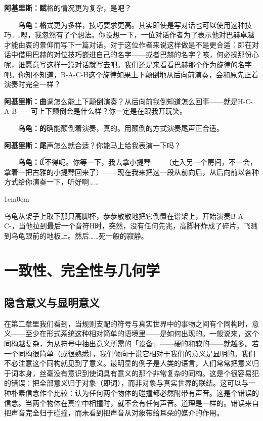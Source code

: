 \documentclass[
  12pt,
  twoside,
  openright,
  oldfontcommands,
]{memoir}
\newcommand{\kaitismall}[1]{{\kaitifamily\small #1}}
\newcommand{\heititext}[1]{{\heifamily\bfseries #1}}
\newcommand{\dialogname}[1]{{\heifamily\bfseries #1}}
\newenvironment{dialogguide}{%
  \begin{adjustwidth}{1em}{0em}\kaitifamily\itshape\small%
}{%
  \end{adjustwidth}%
}
\begin{document}
\dialogname{阿基里斯：}\heititext{赋}格的情况更为复杂，是吧？

\dialogname{　　乌龟：}\heititext{格}式更为多样，技巧要求更高。其实即使是写对话也可以使用这种技巧\ldots\ldots 嗯，我忽然有了个想法。你设想一下，一位对话作者为了表示他对巴赫卓越才能由衷的景仰而写下一篇对话，对于这位作者来说这样做是不是更合适：即在对话中借用巴赫的对位技巧嵌进自己的名字------或者巴赫的名字？咳，何必操那份心呢，谁愿意写这样一篇对话就写去吧。我们还是来看看巴赫那个作为旋律的名字吧。你知不知道，B-A-C-H这个旋律如果上下颠倒地从后向前演奏，会和原先正着演奏时完全一样？

\dialogname{阿基里斯：}\heititext{曲}调怎么能上下颠倒演奏？从后向前我倒知道怎么回事------就是H-C-A-B------可上下颠倒会是什么样？你一定是在跟我开玩笑。

\dialogname{　　乌龟：}\heititext{的}确能颠倒着演奏，真的。用颠倒的方式演奏尾声正合适。

\dialogname{阿基里斯：}\heititext{尾}声怎么就合适？你能马上给我表演一下吗？

\dialogname{　　乌龟：}{\gebfont ꪞ}不得呢。你等一下，我去拿小提琴------\kaitismall{（走入另一个房间，不一会，拿着一把古雅的小提琴回来了）}------现在我来把这一段从前向后，从后向前以各种方式给你演奏一下，听好啊\ldots\ldots{}

\hfill\break

\begin{dialogguide}
乌龟从架子上取下那只高脚杯，恭恭敬敬地把它倒置在谱架上，开始演奏B-A-C-，当他拉到最后一个音符H时，突然，没有任何先兆，高脚杯炸成了碎片，飞溅到乌龟跟前的地板上。然后\ldots\ldots 死一般的寂静。
\end{dialogguide}

\label{Chapter04.xhtml}{}

\chapter{一致性、完全性与几何学}

\section{隐含意义与显明意义}

在第二章里我们看到，当规则支配的符号与真实世界中的事物之间有个同构时，意义------至少在形式系统这种相对简单的语境里------是如何出现的。一般说来，这个同构越复杂，为从符号中抽出意义所需的「设备」------硬的和软的------就越多。若一个同构很简单（或很熟悉），我们倾向于说它相对于我们的意义是显明的。我们不必注意这个同构就见到了意义。最明显的例子是人类的语言，人们常常把意义归于词本身，丝毫没有意识到使词具有意义的那个非常复杂的同构。这是个很容易犯的错误：把全部意义归于对象（即词），而非对象与真实世界的联结。这可以与一种朴素信念作个比较：认为任何两个物体的碰撞都必然附带有声音。这是个错误的信念。当两个物体在真空中相撞时，就不会有任何声音。道理是一样的。错误来自把声音完全归于碰撞，而未看到把声音从对象带给耳朵的媒介的作用。
\end{document}
